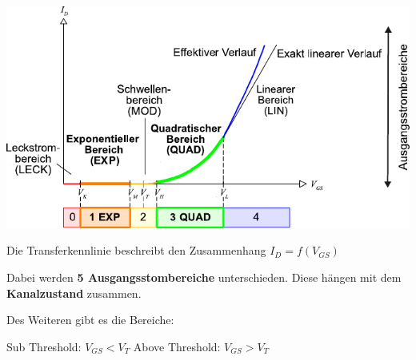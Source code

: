 \begin{minipage}[t]{0.55\columnwidth}
    \includegraphics[width=\columnwidth, align=t]{images/MOSFET_transferkennlinie.pdf}
\end{minipage}
\hfill
\begin{minipage}[t]{0.42\columnwidth}
    Die Transferkennlinie beschreibt den Zusammenhang $I_D = f(V_{GS})$ 

    \smallskip

    Dabei werden \textbf{5 Ausgangsstombereiche} unterschieden. Diese hängen mit dem \textbf{Kanalzustand} zusammen.

    \smallskip

    Des Weiteren gibt es die Bereiche:

    \begin{outline}
        \1 Sub Threshold: $V_{GS} < V_T$
        \1 Above Threshold: $V_{GS} > V_T$
    \end{outline}
\end{minipage}



